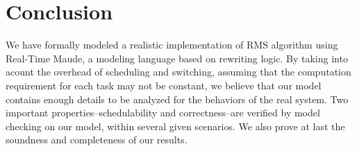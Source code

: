 \documentclass[10pt,journal,compsoc]{IEEEtran}
\newcommand{\hide}[1]{\ignorespaces}
\begin{document}
\section{Conclusion}
\label{s:conclusion}
We have formally modeled a realistic implementation of RMS algorithm
using Real-Time Maude, a modeling language based on rewriting
logic. By taking into acount the overhead of scheduling and switching,
assuming that the computation requirement for each task may not be
constant, we believe that our model contains enough details to be
analyzed for the behaviors of the real system. Two important
properties--schedulability and correctness--are verified by model
checking on our model, within several given scenarios. We also prove
at last the soundness and completeness of our results.


\hide{
\ifCLASSOPTIONcompsoc
  \section*{Acknowledgments}
\else
  \section*{Acknowledgment}
\fi

The authors would like to thank...
}

\ifCLASSOPTIONcaptionsoff
  \newpage
\fi







%
\end{document}
